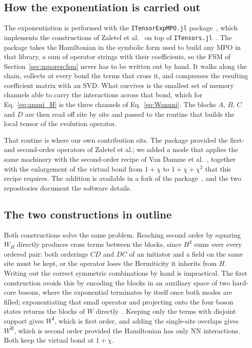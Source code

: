 \subsection{How the exponentiation is carried out}
\label{app:mpo:code}

The exponentiation is performed with the \texttt{ITensorExpMPO.jl} package~\cite{pokart2024expmpo}, which implements the constructions of Zaletel et al.~\cite{zaletel2015} on top of \texttt{ITensors.jl}~\cite{itensor2022}. The package takes the Hamiltonian in the symbolic form used to build any \ac{MPO} in that library, a sum of operator strings with their coefficients, so the \ac{FSM} of Section~\ref{sec:mporep:fsm} never has to be written out by hand. It walks along the chain, collects at every bond the terms that cross it, and compresses the resulting coefficient matrix with an \ac{SVD}. What survives is the smallest set of memory channels able to carry the interactions across that bond, which for Eq.~\eqref{eq:annni_H} is the three channels of Eq.~\eqref{eq:Wannni}. The blocks $A$, $B$, $C$ and $D$ are then read off site by site and passed to the routine that builds the local tensor of the evolution operator.

That routine is where our own contribution sits. The package provided the first- and second-order operators of Zaletel et al.; we added a mode that applies the same machinery with the second-order recipe of Van Damme et al.~\cite{vandamme2024}, together with the enlargement of the virtual bond from $1+\chi$ to $1+\chi+\chi^2$ that this recipe requires. The addition is available in a fork of the package~\cite{marquezolguin2026expmpo}, and the two repositories document the software details.

\subsection{The two constructions in outline}
\label{app:mpo:outline}

Both constructions solve the same problem. Reaching second order by squaring $W_H$ directly produces cross terms between the blocks, since $H^2$ sums over every ordered pair: both orderings $CD$ and $DC$ of an initiator and a field on the same site must be kept, or the operator loses the Hermiticity it inherits from $H$. Writing out the correct symmetric combinations by hand is impractical. The first construction avoids this by encoding the blocks in an auxiliary space of two hard-core bosons, where the exponential terminates by itself once both modes are filled; exponentiating that small operator and projecting onto the four boson states returns the blocks of $W$ directly~\cite{zaletel2015}. Keeping only the terms with disjoint support gives $W^{\mathrm{I}}$, which is first order, and adding the single-site overlaps gives $W^{\mathrm{II}}$, which is second order provided the Hamiltonian has only \ac{NN} interactions. Both keep the virtual bond at $1+\chi$.

